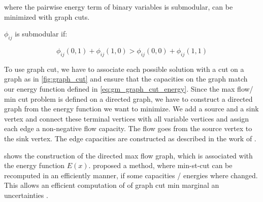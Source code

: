 where the pairwise energy term of binary variables is submodular, can be minimized with
graph cuts. 

$\phi_{ij}$ is submodular if:

\begin{equation} \label{eq:gm_submodular_criterion}
    \phi_{ij}(0,1) + \phi_{ij}(1,0) >  \phi_{ij}(0,0) + \phi_{ij}(1,1)
\end{equation}

To use graph cut, we have to associate each possible solution with a cut on a graph as in
\cref{fig:graph_cut} and ensure that the capacities on the graph match our energy function 
defined in \cref{eq:gm_graph_cut_energy}.
Since the max flow/ min cut problem is defined on a directed graph, we have to construct
a directed graph from the energy function we want to minimize. We add a source and a
sink vertex and connect these terminal vertices with all variable vertices and assign
each edge a non-negative flow capacity. The flow goes from the source vertex to the
sink vertex. The edge capacities are constructed as described in the work of
\citet{kolmogorov_2004_pami}.

 shows the
construction of  the directed max flow  graph, which is associated with the energy function $E(x)$.
\citet{kohli_2007_pami} proposed a method, where min-st-cut can be recomputed in an efficiently manner,
if some capacities / energies where changed. This allows an efficient computation of 
of graph cut min marginal an uncertainties \citep{kohli_2006_eccv,tarlow_2012_cvpr}.


